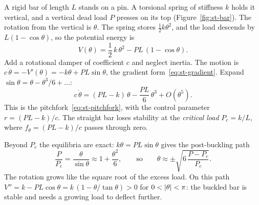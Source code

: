 \begin{example}\label{ex:st-bar}
%
A rigid bar of length $L$ stands on a pin. A torsional spring of stiffness $k$
holds it vertical, and a vertical dead load $P$ presses on its top
(Figure~\ref{fig:st-bar}). The rotation from the vertical is $\theta$. The spring
stores $\tfrac12 k\theta^2$, and the load descends by $L(1 - \cos\theta)$, so the
potential energy is
\begin{equation}\label{eq:st-bar-energy}
  V(\theta) = \frac12\,k\,\theta^2 - P L\,(1 - \cos\theta) .
\end{equation}
Add a rotational damper of coefficient $c$ and neglect inertia. The motion is
$c\,\dot\theta = -V'(\theta) = -k\theta + PL\sin\theta$, the gradient
form~\eqref{eq:st-gradient}. Expand $\sin\theta = \theta - \theta^3/6 + \dots$:
\begin{equation}\label{eq:st-bar-pitchfork}
  c\,\dot\theta = (PL - k)\,\theta - \frac{PL}{6}\,\theta^3 + O(\theta^5).
\end{equation}
This is the pitchfork~\eqref{eq:st-pitchfork}, with the control parameter
$r = (PL - k)/c$. The straight bar loses stability at the \emph{critical load}
$P_c = k/L$, where $f_\theta = (PL - k)/c$ passes through zero.
%

Beyond $P_c$ the equilibria are exact: $k\theta = PL\sin\theta$ gives the
post-buckling path
\begin{equation}\label{eq:st-bar-path}
  \frac{P}{P_c} = \frac{\theta}{\sin\theta} \approx 1 + \frac{\theta^2}{6},
  \qquad\text{so}\qquad
  \theta \approx \pm\sqrt{6\,\frac{P - P_c}{P_c}} .
\end{equation}
The rotation grows like the square root of the excess load. On this path
$V'' = k - PL\cos\theta = k\,(1 - \theta/\tan\theta) > 0$ for
$0 < \lvert \theta\rvert < \pi$: the buckled bar is stable and needs a growing load to
deflect further.
\end{example}

